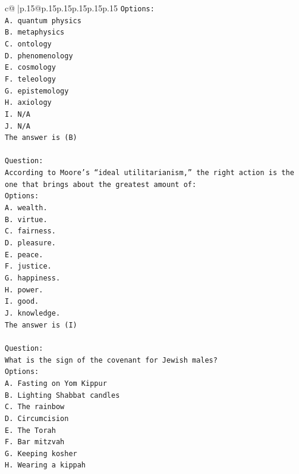 \documentclass{article}
\begin{document}
{\begin{supertabular}{c@{$\;$}|p{.15\linewidth}@{}p{.15\linewidth}p{.15\linewidth}p{.15\linewidth}p{.15\linewidth}p{.15\linewidth}}
{{{\texttt{Options:} \\
\texttt{A. quantum physics} \\
\texttt{B. metaphysics} \\
\texttt{C. ontology} \\
\texttt{D. phenomenology} \\
\texttt{E. cosmology} \\
\texttt{F. teleology} \\
\texttt{G. epistemology} \\
\texttt{H. axiology} \\
\texttt{I. N/A} \\
\texttt{J. N/A} \\
\texttt{The answer is (B)} \\
\\ 
\texttt{Question:} \\
\texttt{According to Moore’s “ideal utilitarianism,” the right action is the one that brings about the greatest amount of:} \\
\texttt{Options:} \\
\texttt{A. wealth.} \\
\texttt{B. virtue.} \\
\texttt{C. fairness.} \\
\texttt{D. pleasure.} \\
\texttt{E. peace.} \\
\texttt{F. justice.} \\
\texttt{G. happiness.} \\
\texttt{H. power.} \\
\texttt{I. good.} \\
\texttt{J. knowledge.} \\
\texttt{The answer is (I)} \\
\\ 
\texttt{Question:} \\
\texttt{What is the sign of the covenant for Jewish males?} \\
\texttt{Options:} \\
\texttt{A. Fasting on Yom Kippur} \\
\texttt{B. Lighting Shabbat candles} \\
\texttt{C. The rainbow} \\
\texttt{D. Circumcision} \\
\texttt{E. The Torah} \\
\texttt{F. Bar mitzvah} \\
\texttt{G. Keeping kosher} \\
\texttt{H. Wearing a kippah} \\
}}}
\end{supertabular}}
\end{document}
